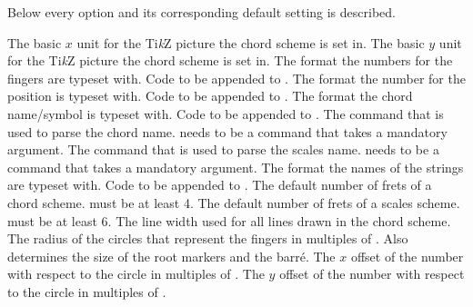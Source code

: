 \documentclass[load-preamble+]{cnltx-doc}
\newcommand*\TikZ{Ti\textit{k}Z}
\begin{document}
Below every option and its corresponding default setting is described.
\begin{options}
  \Default{.8cm}
    The basic $x$ unit for the \TikZ{} picture the chord scheme is set in.
  \Default{.8cm}
    The basic $y$ unit for the \TikZ{} picture the chord scheme is set in.
    The format the numbers for the fingers are typeset with.
  \Default
    Code to be appended to .
    The format the number for the position is typeset with.
  \Default
    Code to be appended to .
    The format the chord name/symbol is typeset with.
  \Default
    Code to be appended to .
    The command that is used to parse the chord name.
     needs to be a command that takes a mandatory argument.
    The command that is used to parse the scales name.
     needs to be a command that takes a mandatory argument.
    The format the names of the strings are typeset with.
  \Default
    Code to be appended to .
    The default number of frets of a chord scheme.
     must be at least 4. 
    The default number of frets of a scales scheme.
     must be at least 6.
  \Default{1pt}
    The line width used for all lines drawn in the chord scheme.
    The radius of the circles that represent the fingers in multiples of
    .  Also determines the size of the root markers and the
    barr\'e.
    The $x$ offset of the number with respect to the circle in multiples of
    .
    The $y$ offset of the number with respect to the circle in multiples of
    .
  \keyval{finger-style}{\TikZ{} style}

\end{options}
\end{document}
